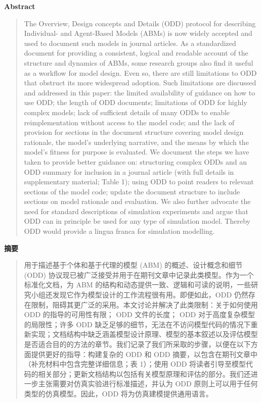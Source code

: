 \vspace{1.5em}
\noindent\textbf{Abstract}\par
\begin{quote}\small
The Overview, Design concepts and Details (ODD) protocol for describing Individual- and Agent-Based Models (ABMs) is now widely accepted and used to document such models in journal articles. As a standardized document for providing a consistent, logical and readable account of the structure and dynamics of ABMs, some research groups also find it useful as a workflow for model design. Even so, there are still limitations to ODD that obstruct its more widespread adoption. Such limitations are discussed and addressed in this paper: the limited availability of guidance on how to use ODD; the length of ODD documents; limitations of ODD for highly complex models; lack of sufficient details of many ODDs to enable reimplementation without access to the model code; and the lack of provision for sections in the document structure covering model design rationale, the model's underlying narrative, and the means by which the model's fitness for purpose is evaluated. We document the steps we have taken to provide better guidance on: structuring complex ODDs and an ODD summary for inclusion in a journal article (with full details in supplementary material; Table 1); using ODD to point readers to relevant sections of the model code; update the document structure to include sections on model rationale and evaluation. We also further advocate the need for standard descriptions of simulation experiments and argue that ODD can in principle be used for any type of simulation model. Thereby ODD would provide a lingua franca for simulation modelling.
\end{quote}

\noindent\textbf{摘要}\par
\begin{quote}\small
用于描述基于个体和基于代理的模型 (ABM) 的概述、设计概念和细节 (ODD) 协议现已被广泛接受并用于在期刊文章中记录此类模型。作为一个标准化文档，为 ABM 的结构和动态提供一致、逻辑和可读的说明，一些研究小组还发现它作为模型设计的工作流程很有用。即便如此，ODD 仍然存在限制，阻碍其更广泛的采用。本文讨论并解决了此类限制：关于如何使用 ODD 的指导的可用性有限； ODD 文件的长度； ODD 对于高度复杂模型的局限性；许多 ODD 缺乏足够的细节，无法在不访问模型代码的情况下重新实现；文档结构中缺乏涵盖模型设计原理、模型的基本叙述以及评估模型是否适合目的的方法的章节。我们记录了我们所采取的步骤，以便在以下方面提供更好的指导：构建复杂的 ODD 和 ODD 摘要，以包含在期刊文章中（补充材料中包含完整详细信息；表 1）；使用 ODD 将读者引导至模型代码的相关部分；更新文档结构以包括有关模型原理和评估的部分。我们还进一步主张需要对仿真实验进行标准描述，并认为 ODD 原则上可以用于任何类型的仿真模型。因此，ODD 将为仿真建模提供通用语言。
\end{quote}

